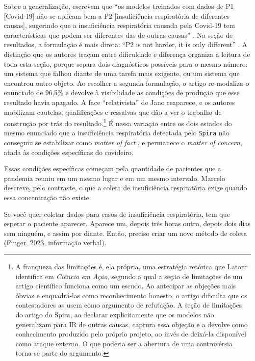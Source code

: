 Sobre a generalização, escrevem que \enquote{os modelos treinados com dados de P1 [Covid-19] não se aplicam bem a P2 [insuficiência respiratória de diferentes causas], sugerindo que a insuficiência respiratória causada pela Covid-19 tem características que podem ser diferentes das de outras causas} \parencite{Gauy2024Discriminant}. Na seção de resultados, a formulação é mais direta: \enquote{P2 is not harder, it is only different} \parencite{Gauy2024Discriminant}. A distinção que os autores traçam entre dificuldade e diferença organiza a leitura de toda esta seção, porque separa dois diagnósticos possíveis para o mesmo número: um sistema que falhou diante de uma tarefa mais exigente, ou um sistema que encontrou outro objeto. Ao escolher a segunda formulação, o artigo re-modaliza o enunciado de 96,5\% e devolve à visibilidade as condições de produção que esse resultado havia apagado. A face \enquote{relativista} de Jano reaparece, e os autores mobilizam cautelas, qualificações e ressalvas que dão a ver o trabalho de construção por trás do resultado.\footnote{A franqueza das limitações é, ela própria, uma estratégia retórica que Latour identifica em \textit{Ciência em Ação}, segundo a qual a seção de limitações de um artigo científico funciona como um escudo. Ao antecipar as objeções mais óbvias e enquadrá-las como reconhecimento honesto, o artigo dificulta que os contestadores as usem como argumento de refutação. A seção de limitações do artigo do Spira, ao declarar explicitamente que os modelos não generalizam para IR de outras causas, captura essa objeção e a devolve como conhecimento produzido pelo próprio projeto, ao invés de deixá-la disponível como ataque externo. O que poderia ser a abertura de uma controvérsia torna-se parte do argumento.} É nessa variação entre os dois estados do mesmo enunciado que a insuficiência respiratória detectada pelo \texttt{Spira} não conseguiu se estabilizar como \textit{matter of fact} \parencite{latour2004politics}, e permanece o \textit{matter of concern}, atada às condições específicas do covideiro.

Essas condições específicas começam pela quantidade de pacientes que a pandemia reuniu em um mesmo lugar e em um mesmo intervalo. Marcelo descreve, pelo contraste, o que a coleta de insuficiência respiratória exige quando essa concentração não existe:
\begin{citacaoabnt}
Se você quer coletar dados para casos de insuficiência respiratória, tem que esperar o paciente aparecer. Aparece um, depois três horas outro, depois dois dias sem ninguém, e assim por diante. Então, preciso criar um novo método de coleta (Finger, 2023, informação verbal).
\end{citacaoabnt}


